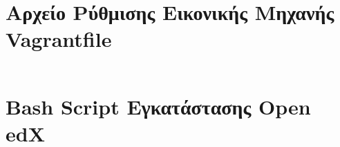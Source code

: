 \documentclass[12pt]{report}
\begin{document}
\begin{appendices}
\chapter{Αρχείο Ρύθμισης Εικονικής Μηχανής \textlatin{Vagrantfile}}\label{AppA}
\inputminted[linenos, fontsize=\scriptsize, breaklines, baselinestretch=1]{ruby}{sources/Vagrantfile}
\chapter{\textlatin{Bash Script} Εγκατάστασης \textlatin{Open edX}}\label{AppB}
\inputminted[linenos, fontsize=\scriptsize, breaklines, baselinestretch=1]{bash}{sources/install_edx.sh}
\end{appendices}

\appendix



\end{document}
